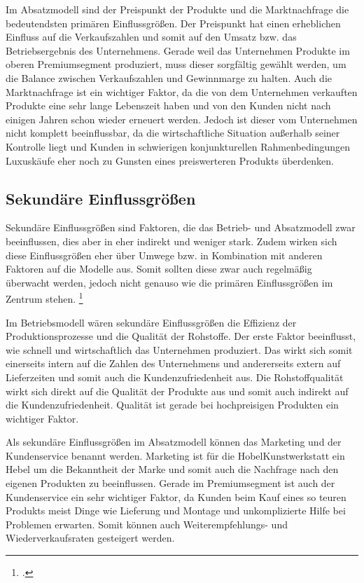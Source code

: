 Im Absatzmodell sind der Preispunkt der Produkte und die Marktnachfrage die bedeutendsten primären Einflussgrö{\ss}en. Der Preispunkt hat einen erheblichen Einfluss auf die Verkaufszahlen und somit auf den Umsatz bzw. das Betriebsergebnis des Unternehmens. Gerade weil das Unternehmen Produkte im oberen Premiumsegment produziert, muss dieser sorgfältig gewählt werden, um die Balance zwischen Verkaufszahlen und Gewinnmarge zu halten. Auch die Marktnachfrage ist ein wichtiger Faktor, da die von dem Unternehmen verkauften Produkte eine sehr lange Lebenszeit haben und von den Kunden nicht nach einigen Jahren schon wieder erneuert werden. Jedoch ist dieser vom Unternehmen nicht komplett beeinflussbar, da die wirtschaftliche Situation au{\ss}erhalb seiner Kontrolle liegt und Kunden in schwierigen konjunkturellen Rahmenbedingungen Luxuskäufe eher noch zu Gunsten eines preiswerteren Produkts überdenken. 

\subsection{Sekundäre Einflussgrö{\ss}en}

Sekundäre Einflussgrö{\ss}en sind Faktoren, die das Betrieb- und Absatzmodell zwar beeinflussen, dies aber in eher indirekt und weniger stark. Zudem wirken sich diese Einflussgrö{\ss}en eher über Umwege bzw. in Kombination mit anderen Faktoren auf die Modelle aus. Somit sollten diese zwar auch regelmä{\ss}ig überwacht werden, jedoch nicht genauso wie die primären Einflussgrö{\ss}en im Zentrum stehen. \footcite[Vgl.][S. 67]{kupper1980interdependenzen}

Im Betriebsmodell wären sekundäre Einflussgrö{\ss}en die Effizienz der Produktionsprozesse und die Qualität der Rohstoffe. Der erste Faktor beeinflusst, wie schnell und wirtschaftlich das Unternehmen produziert. Das wirkt sich somit einerseits intern auf die Zahlen des Unternehmens und andererseits extern auf Lieferzeiten und somit auch die Kundenzufriedenheit aus. Die Rohstoffqualität wirkt sich direkt auf die Qualität der Produkte aus und somit auch indirekt auf die Kundenzufriedenheit. Qualität ist gerade bei hochpreisigen Produkten ein wichtiger Faktor.

Als sekundäre Einflussgrö{\ss}en im Absatzmodell können das Marketing und der Kundenservice benannt werden. Marketing ist für die HobelKunstwerkstatt ein Hebel um die Bekanntheit der Marke und somit auch die Nachfrage nach den eigenen Produkten zu beeinflussen. Gerade im Premiumsegment ist auch der Kundenservice ein sehr wichtiger Faktor, da Kunden beim Kauf eines so teuren Produkts meist Dinge wie Lieferung und Montage und unkomplizierte Hilfe bei Problemen erwarten. Somit können auch Weiterempfehlungs- und Wiederverkaufsraten gesteigert werden.


